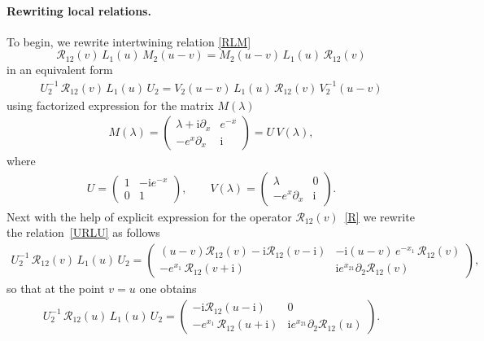\documentclass[11pt]{article}
\numberwithin{equation}{section}
\theoremstyle{plain}
\theoremstyle{definition}
\renewcommand{\imath}{\mathrm{i}}
\begin{document}
\paragraph{Rewriting local relations.} 
To begin, we rewrite intertwining relation \eqref{RLM}
\begin{equation}
	\mathcal{R}_{12}(v) \, L_1(u) \, M_2(u - v) = M_2(u - v) \, L_1(u) \, \mathcal{R}_{12}( v)
\end{equation}
in an equivalent form 
\begin{align} \label{URLU}
U^{-1}_2\,\mathcal{R}_{12}(v) \, L_1(u) \,U_2 = V_2(u - v) \, L_1(u) \, 
\mathcal{R}_{12}( v)\,V^{-1}_2(u - v)
\end{align}
using factorized expression for the matrix $M(\lambda)$
\begin{align} \label{M-fact}
M(\lambda) = \begin{pmatrix}
		\lambda + \imath \partial_{x} & e^{-x} \\[4pt]
		-e^{x} \partial_{x} & \imath
	\end{pmatrix} = U\,V(\lambda),
\end{align}
where
\begin{align}
U = \begin{pmatrix}
		1 & -\imath e^{-x} \\[4pt]
		0 & 1
	\end{pmatrix}, \qquad
	V(\lambda) = \begin{pmatrix}
		\lambda & 0 \\[4pt]
		-e^{x} \partial_{x} & \imath
	\end{pmatrix}.
\end{align}
Next with the help of explicit expression for the operator $\mathcal{R}_{12}(v)$~\eqref{R} we rewrite the relation~\eqref{URLU} as follows
\begin{align}
U^{-1}_2\,\mathcal{R}_{12}(v) \, L_1(u) \,U_2 = 
\begin{pmatrix}
(u-v)\mathcal{R}_{12}(v)-\imath\mathcal{R}_{12}(v-\imath) & 
-\imath (u-v)\,e^{-x_1}\,\mathcal{R}_{12}(v) \\[6pt]
-e^{x_1}\,\mathcal{R}_{12}(v+\imath) & 
\imath e^{x_{21}}\partial_2 \mathcal{R}_{12}(v)
	\end{pmatrix},
\end{align}
so that at the point $v=u$ one obtains 
\begin{align}\label{Bax1}
U^{-1}_2\,\mathcal{R}_{12}(u) \, L_1(u) \,U_2 = 
\begin{pmatrix}
-\imath\mathcal{R}_{12}(u-\imath) & 0 \\[6pt]
-e^{x_1}\,\mathcal{R}_{12}(u+\imath) & 
\imath e^{x_{21}}\partial_2 \mathcal{R}_{12}(u)
	\end{pmatrix}.
\end{align}
\end{document}
